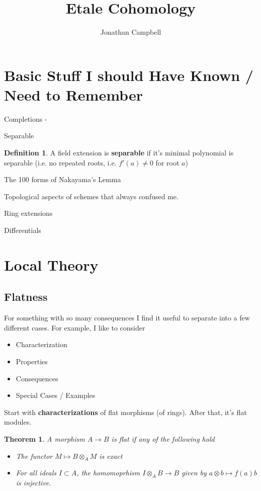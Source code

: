 \documentclass[english]{amsart}
\title{Etale Cohomology}
\author{Jonathan Campbell}
\newtheorem*{thm}{Theorem}
\theoremstyle{definition}
\newtheorem*{defn}{Definition}
\begin{document}
\maketitle
\tableofcontents 


\section{Basic Stuff I should Have Known / Need to Remember}

Completions - 


Separable
\begin{defn}
A field extension is \textbf{separable} if it's minimal polynomial is separable (i.e. no repeated roots, i.e. $f'(a) \neq 0$ for root $a$)
\end{defn}

The 100 forms of Nakayama's Lemma

Topological aspects of schemes that always confused me. 


Ring extensions

Differentials


\section{Local Theory}

\subsection{Flatness}

For something with so many consequences I find it useful to separate into a few different cases. For example, I like to consider
\begin{itemize}
\item Characterization
\item Properties
\item Consequences
\item Special Cases / Examples 
\end{itemize}

Start with \textbf{characterizations} of flat morphisms (of rings). After that, it's flat modules. 

\begin{thm}
A morphism $A \to B$ is flat if any of the following hold
\begin{itemize}
\item The functor $M \mapsto B \otimes_A M$ is exact
\item For all ideals $I \subset A$, the homomoprhism $I \otimes_A B \to B$ given by $a \otimes b \mapsto f(a) b$ is injective. 
\end{itemize}
\end{thm}
\end{document}
